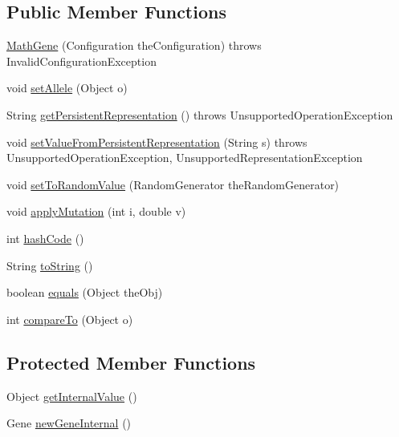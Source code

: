 \subsection*{Public Member Functions}
\begin{DoxyCompactItemize}
\item 
\hyperlink{classexamples_1_1math_1_1ga_1_1_math_gene_a36083443e54b7e53a2b1f241be375855}{Math\-Gene} (Configuration the\-Configuration)  throws Invalid\-Configuration\-Exception 
\item 
void \hyperlink{classexamples_1_1math_1_1ga_1_1_math_gene_a53b1b2d79cd8d7f0ef080b7b5a727b49}{set\-Allele} (Object o)
\item 
String \hyperlink{classexamples_1_1math_1_1ga_1_1_math_gene_aabcea600d9f4c213216913cbef603c24}{get\-Persistent\-Representation} ()  throws Unsupported\-Operation\-Exception 
\item 
void \hyperlink{classexamples_1_1math_1_1ga_1_1_math_gene_a91c0b0775ecada74cc882ded9967da62}{set\-Value\-From\-Persistent\-Representation} (String s)  throws Unsupported\-Operation\-Exception, Unsupported\-Representation\-Exception 
\item 
void \hyperlink{classexamples_1_1math_1_1ga_1_1_math_gene_a2836edbc88555070b9a443278487e2b9}{set\-To\-Random\-Value} (Random\-Generator the\-Random\-Generator)
\item 
void \hyperlink{classexamples_1_1math_1_1ga_1_1_math_gene_abc782ff856514ab9d2c298be877721ca}{apply\-Mutation} (int i, double v)
\item 
int \hyperlink{classexamples_1_1math_1_1ga_1_1_math_gene_a2ce1b33316a00eef365473f9d51895a7}{hash\-Code} ()
\item 
String \hyperlink{classexamples_1_1math_1_1ga_1_1_math_gene_a402e274b64a44c48617cc85c2052c0b1}{to\-String} ()
\item 
boolean \hyperlink{classexamples_1_1math_1_1ga_1_1_math_gene_ada5ae80a7b8aa0827db9db809715ed36}{equals} (Object the\-Obj)
\item 
int \hyperlink{classexamples_1_1math_1_1ga_1_1_math_gene_a65bbb9b652baa0f5a714e1b89900a339}{compare\-To} (Object o)
\end{DoxyCompactItemize}
\subsection*{Protected Member Functions}
\begin{DoxyCompactItemize}
\item 
Object \hyperlink{classexamples_1_1math_1_1ga_1_1_math_gene_a1545395527262d9fc359752766918c15}{get\-Internal\-Value} ()
\item 
Gene \hyperlink{classexamples_1_1math_1_1ga_1_1_math_gene_a199be7abae88aeeddccc7fa0da97ddd0}{new\-Gene\-Internal} ()
\end{DoxyCompactItemize}
